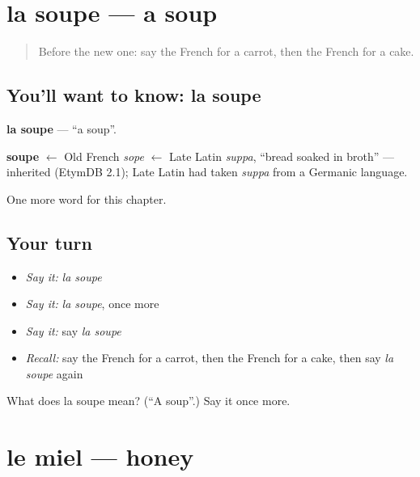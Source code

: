 \section[la soupe]{la soupe — a soup}

\label{lesson:FR-C69-soupe}



\begin{quote}
Before the new one: say the French for a carrot, then the French for a cake.
\end{quote}

\subsection*{You'll want to know: la soupe}
\textbf{la soupe} — \textquotedblleft{}a soup\textquotedblright{}.

\begin{cousinweb}
\textbf{soupe} $\leftarrow$ Old French \emph{sope} $\leftarrow$ Late Latin \emph{suppa}, \textquotedblleft{}bread soaked in broth\textquotedblright{} — inherited (EtymDB 2.1); Late Latin had taken \emph{suppa} from a Germanic language.
\end{cousinweb}

\begin{grammarlens}[title={What you've built}]
One more word for this chapter.
\end{grammarlens}

\subsection*{Your turn}
\begin{itemize}
\raggedright
  \item \emph{Say it:} \emph{la soupe}
  \item \emph{Say it:} \emph{la soupe}, once more
  \item \emph{Say it:} say \emph{la soupe}
  \item \emph{Recall:} say the French for a carrot, then the French for a cake, then say \emph{la soupe} again
\end{itemize}

\begin{tcolorbox}[breakable,colback=teal!4,colframe=teal!35!black,title={Before you move on}]
What does la soupe mean? (\textquotedblleft{}A soup\textquotedblright{}.) Say it once more.
\end{tcolorbox}
\section[le miel]{le miel — honey}

